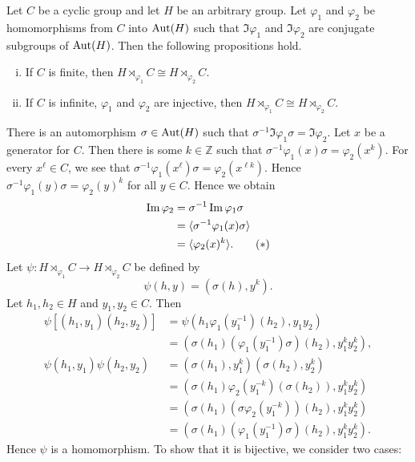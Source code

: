 \begin{proposition} \label{prop-semidirect-useful-tool}
	Let $C$ be a cyclic group and let $H$ be an arbitrary group. Let $\varphi_1$ and $\varphi_2$ be homomorphisms from $C$ into $\Aut (H)$ such that $\Im  \varphi_1$ and $\Im \varphi_2$ are conjugate subgroups of $\Aut (H)$. Then the following propositions hold.
	\begin{enumerate}[(i)]
		\item If $C$ is finite, then $H\rtimes_{\varphi_1} C \cong H\rtimes_{\varphi_2} C$.
		\item If $C$ is infinite,  $\varphi_1$ and $\varphi_2$ are injective, then $H \rtimes_{\varphi_1} C \cong H \rtimes_{\varphi_2} C$.
	\end{enumerate} 
\end{proposition}
\begin{sketch}
 	There is an automorphism $\sigma\in \Aut (H)$ such that $\sigma^{-1} \Im  \varphi_1 \sigma = \Im  \varphi_2$. Let $x$ be a generator for $C$. Then there is some $k\in\mathbb{Z}$ such that $\sigma^{-1} \varphi_1(x) \sigma =  \varphi_2(x^k)$. For every $x^\ell\in C$, we see that $ \sigma^{-1} \varphi_1(x^\ell) \sigma = \varphi_2(x^{\ell k}) $. Hence $\sigma^{-1} \varphi_1(y) \sigma =  \varphi_2(y)^k$ for all $y\in C$. Hence we obtain
 	\begin{align}
 		\Im \varphi_2 &= \sigma^{-1}\Im \varphi_1 \sigma \notag
 		\\
 		&= \langle \sigma^{-1}\varphi_1(x) \sigma \rangle \notag
 		\\
 		&= \langle \varphi_2(x)^k\rangle. \tag{$*$} \label{eq-prop-8.16}
 	\end{align}  Let $\psi: H\rtimes_{\varphi_1} C \rightarrow H\rtimes_{\varphi_2} C$ be defined by 
 	\begin{equation*}
 		\psi(h,y) = (\sigma(h),y^k).
 	\end{equation*}
 	Let $h_1,h_2\in H$ and $y_1,y_2\in C$. Then
 	\begin{align*}
 	\psi[(h_1,y_1)(h_2,y_2)] &= \psi(h_1 \varphi_1(y_1^{-1})(h_2), y_1y_2)
 	\\
 	&= \left(\sigma(h_1) (\varphi_1(y_1^{-1})\sigma)(h_2), y_1^ky_2^k\right),
 	\\
 	\psi(h_1,y_1)\psi(h_2,y_2) &= \left(\sigma(h_1),y_1^k\right)\left(\sigma(h_2),y_2^k\right)
 	\\
 	&= \left(\sigma(h_1)\varphi_2(y_1^{-k})(\sigma(h_2)),y_1^ky_2^k\right)
 	\\
 	&= \left(\sigma(h_1)( \sigma\varphi_2(y_1^{-k}))(h_2),y_1^ky_2^k\right)
 	\\
 	&= \left(\sigma(h_1)(\varphi_1(y_1^{-1})\sigma )(h_2),y_1^ky_2^k\right).
 	\end{align*}
 Hence $\psi$ is a homomorphism.  To show that it is bijective, we consider two cases:
 	

\end{sketch}
